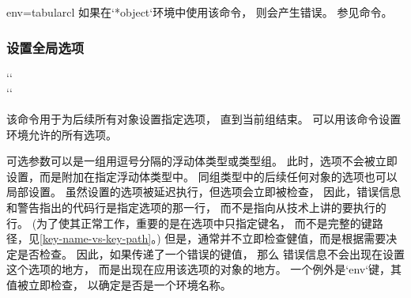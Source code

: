 \begin{tableobject}{env=tabular}{cl}
如果在`*object`环境中使用该命令，
则会产生错误。
参见命令。


\subsubsection{设置全局选项}
\label{setting-options-globally}

\DescribeMacro{\objectset}
`` \\
``

该命令用于为后续所有对象设置指定选项，
直到当前组结束。
可以用该命令设置环境允许的所有选项。

可选参数可以是一组用逗号分隔的浮动体类型或类型组。
此时，选项不会被立即设置，而是附加在指定浮动体类型中。
同组类型中的后续任何对象的选项也可以局部设置。
虽然设置的选项被延迟执行，但选项会立即被检查，
因此，错误信息和警告指出的代码行是指定选项的那一行，
而不是指向从技术上讲的要执行的行。
(为了使其正常工作，重要的是在选项中只指定键名，
而不是完整的键路径，见\cref{key-name-vs-key-path}。)
但是，通常并不立即检查健值，而是根据需要决定是否检查。
因此，如果传递了一个错误的键值，
那么 错误信息不会出现在设置这个选项的地方，
而是出现在应用该选项的对象的地方。
一个例外是`env`键，其值被立即检查，
以确定是否是一个环境名称。


\end{tableobject}
